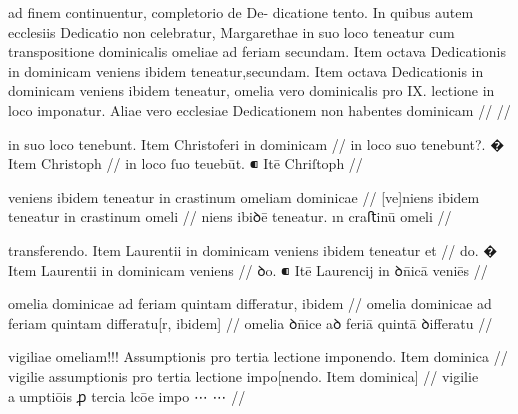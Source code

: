 \ex \bg
\gla
{}
ad finem continuentur, completorio de De-
dicatione tento.
In quibus autem ecclesiis Dedicatio non celebratur, Margarethae
in suo loco teneatur cum transpositione dominicalis omeliae ad feriam
secundam.
Item octava Dedicationis in dominicam veniens ibidem teneatur,secundam.
Item octava Dedicationis in dominicam veniens ibidem teneatur,
omelia vero dominicalis pro IX. lectione in loco imponatur. Aliae vero
ecclesiae Dedicationem non habentes dominicam
//
\glRekonstrukcja
{}
//
\endgl
\xe



\ex \bg
\gla
{}
in suo loco {} tenebunt.
{} Item Christoferi in dominicam 
//
\glRekonstrukcja
{}
in {} loco suo tenebunt?.
� Item Christoph 
//
\glU
{}
in {} loco ſuo teuebūt. ⁌ Itē Chriſtoph 
//
\endgl
\xe



\ex \bg
\gla
{}
veniens ibidem teneatur in crastinum
omeliam dominicae 
//
\glRekonstrukcja
{}
[ve]niens ibidem teneatur in crastinum
omeli
//
\glU
{}
niens ibiꝺē teneatur. ın craﬅinū omeli
//
\endgl
\xe



\ex \bg
\gla
{}
transferendo.
{} Item Laurentii in dominicam veniens ibidem teneatur et 
//
\glRekonstrukcja
{}
do.
� Item Laurentii in dominicam veniens
//
\glU
{}
ꝺo. ⁌ Itē Laurencij in ꝺn̄icā veniēs
//
\endgl
\xe



\ex \bg
\gla
{}
omelia
dominicae ad feriam quintam differatur, ibidem 
//
\glRekonstrukcja
{}
omelia
dominicae ad feriam quintam differatu[r, ibidem]
//
\glU
{}
omelia ꝺn̄ice aꝺ feriā quintā ꝺiﬀeratu
//
\endgl
\xe



\ex \bg
\gla
{}
vigiliae omeliam!!! Assumptionis pro tertia lectione imponendo. Item dominica 
//
\glRekonstrukcja
{}
vigilie {} assumptionis pro tertia lectione impo[nendo. Item dominica] 
//
\glU
{}
vigilie {} aumptiōis ꝓ tercia lcōe impo ⋯ ⋯
//
\endgl
\xe




